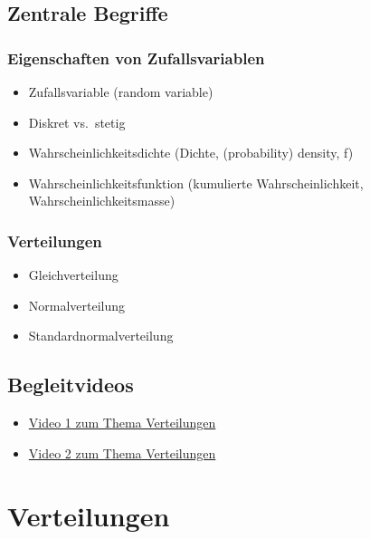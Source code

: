 \documentclass[
  a4paper,
  DIV=11]{scrreprt}
\providecommand{\tightlist}{%
  \setlength{\itemsep}{0pt}\setlength{\parskip}{0pt}}\usepackage{longtable,booktabs,array}
\theoremstyle{definition}
\theoremstyle{remark}
\begin{document}
\hypertarget{zentrale-begriffe-1}{%
\subsection{Zentrale Begriffe}\label{zentrale-begriffe-1}}

\hypertarget{eigenschaften-von-zufallsvariablen}{%
\subsubsection{Eigenschaften von
Zufallsvariablen}\label{eigenschaften-von-zufallsvariablen}}

\begin{itemize}
\tightlist
\item
  Zufallsvariable (random variable)
\item
  Diskret vs.~stetig
\item
  Wahrscheinlichkeitsdichte (Dichte, (probability) density, f)
\item
  Wahrscheinlichkeitsfunktion (kumulierte Wahrscheinlichkeit,
  Wahrscheinlichkeitsmasse)
\end{itemize}

\hypertarget{verteilungen-1}{%
\subsubsection{Verteilungen}\label{verteilungen-1}}

\begin{itemize}
\tightlist
\item
  Gleichverteilung
\item
  Normalverteilung
\item
  Standardnormalverteilung
\end{itemize}

\hypertarget{begleitvideos-2}{%
\subsection{Begleitvideos}\label{begleitvideos-2}}

\begin{itemize}
\tightlist
\item
  \href{https://youtu.be/7GqIE4sKDs4}{Video 1 zum Thema Verteilungen}
\item
  \href{https://youtu.be/HKWwondYsW8}{Video 2 zum Thema Verteilungen}
\end{itemize}

\hypertarget{verteilungen-2}{%
\section{Verteilungen}\label{verteilungen-2}}
\end{document}
